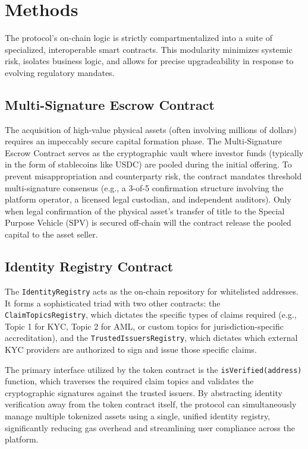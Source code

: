 \documentclass{Resources/bdlt-project}
\begin{document}
\section{Methods}
The protocol's on-chain logic is strictly compartmentalized into a suite of specialized, interoperable smart contracts. This modularity minimizes systemic risk, isolates business logic, and allows for precise upgradeability in response to evolving regulatory mandates.

\subsection{Multi-Signature Escrow Contract}
The acquisition of high-value physical assets (often involving millions of dollars) requires an impeccably secure capital formation phase. The Multi-Signature Escrow Contract serves as the cryptographic vault where investor funds (typically in the form of stablecoins like USDC) are pooled during the initial offering. To prevent misappropriation and counterparty risk, the contract mandates threshold multi-signature consensus (e.g., a 3-of-5 confirmation structure involving the platform operator, a licensed legal custodian, and independent auditors). Only when legal confirmation of the physical asset's transfer of title to the Special Purpose Vehicle (SPV) is secured off-chain will the contract release the pooled capital to the asset seller.

\subsection{Identity Registry Contract}
The \texttt{IdentityRegistry} acts as the on-chain repository for whitelisted addresses. It forms a sophisticated triad with two other contracts: the \texttt{ClaimTopicsRegistry}, which dictates the specific types of claims required (e.g., Topic 1 for KYC, Topic 2 for AML, or custom topics for jurisdiction-specific accreditation), and the \texttt{TrustedIssuersRegistry}, which dictates which external KYC providers are authorized to sign and issue those specific claims.

The primary interface utilized by the token contract is the \texttt{isVerified(address)} function, which traverses the required claim topics and validates the cryptographic signatures against the trusted issuers. By abstracting identity verification away from the token contract itself, the protocol can simultaneously manage multiple tokenized assets using a single, unified identity registry, significantly reducing gas overhead and streamlining user compliance across the platform.
\end{document}
